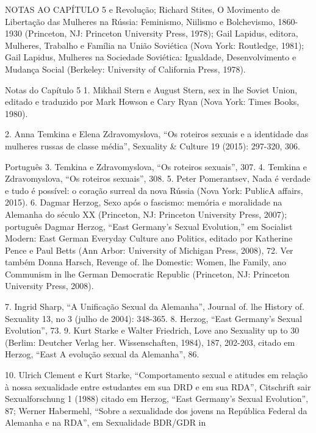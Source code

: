  \par 
NOTAS AO CAPÍTULO {\color{blue}5} e Revolução; Richard Stites, O Movimento de Libertação das Mulheres na Rússia: Feminismo, Niilismo e Bolchevismo, 1860-1930 (Princeton, NJ: Princeton University Press, 1978); Gail Lapidus, editora, Mulheres, Trabalho e Família na União Soviética (Nova York: Routledge, 1981); Gail Lapidus, Mulheres na Sociedade Soviética: Igualdade, Desenvolvimento e Mudança Social (Berkeley: University of California Press, 1978).
 \par 
Notas do Capítulo {\color{blue}5} 1. Mikhail Stern e August Stern, sex in lhe Soviet Union, editado e traduzido por Mark Howson e Cary Ryan (Nova York: Times Books, 1980).
 \par 
2. Anna Temkina e Elena Zdravomyslova, “Os roteiros sexuais e a identidade das mulheres russas de classe média”, Sexuality & Culture {\color{blue}19} (2015): 297-320, {\color{blue}306}.
 \par 
Português {\color{blue}3}. Temkina e Zdravomyslova, “Os roteiros sexuais”, {\color{blue}307}. {\color{blue}4}. Temkina e Zdravomyslova, “Os roteiros sexuais”, {\color{blue}308}. {\color{blue}5}. Peter Pomerantsev, Nada é verdade e tudo é possível: o coração surreal da nova Rússia (Nova York: PublicA affairs, 2015). {\color{blue}6}. Dagmar Herzog, Sexo após o fascismo: memória e moralidade na Alemanha do século XX (Princeton, NJ: Princeton University Press, 2007); português Dagmar Herzog, “East Germany’s Sexual Evolution,” em Socialist Modern: East German Everyday Culture ano Politics, editado por Katherine Pence e Paul Betts (Ann Arbor: University of Michigan Press, 2008), {\color{blue}72}. Ver também Donna Harsch, Revenge of. lhe Domestic: Women, lhe Family, ano Communism in lhe German Democratic Republic (Princeton, NJ: Princeton University Press, 2008).
 \par 
7. Ingrid Sharp, “A Unificação Sexual da Alemanha”, Journal of. lhe History of. Sexuality 13, no {\color{blue}3} (julho de 2004): 348-365. {\color{blue}8}. Herzog, “East Germany's Sexual Evolution”, {\color{blue}73}. {\color{blue}9}. Kurt Starke e Walter Friedrich, Love ano Sexuality up to {\color{blue}30} (Berlim: Deutcher Verlag her. Wissenschaften, 1984), 187, 202-203, citado em Herzog, “East A evolução sexual da Alemanha”, {\color{blue}86}.
 \par 
10. Ulrich Clement e Kurt Starke, “Comportamento sexual e atitudes em relação à nossa sexualidade entre estudantes em sua DRD e em sua RDA”, Citschrift sair Sexualforschung {\color{blue}1} (1988) citado em Herzog, “East Germany’s Sexual Evolution”, 87; Werner Habermehl, “Sobre a sexualidade dos jovens na República Federal da Alemanha e na RDA”, em Sexualidade BDR/GDR in
